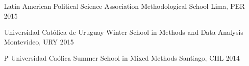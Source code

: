 \vspace{1mm}

\begin{cvhonors}
\cvconf
{Latin American Political Science Association Methodological School}
{Lima, PER}
{2015}
\end{cvhonors}

\vspace{1mm}

\begin{cvhonors}
\cvconf
{Universidad Católica de Uruguay Winter School in Methods and Data Analysis}
{Montevideo, URY}
{2015}
\end{cvhonors}

\vspace{1mm}

\begin{cvhonors}
\cvconf
{P Universidad Caólica Summer School in Mixed Methods}
{Santiago, CHL}
{2014}
\end{cvhonors}

\vspace{1mm}
